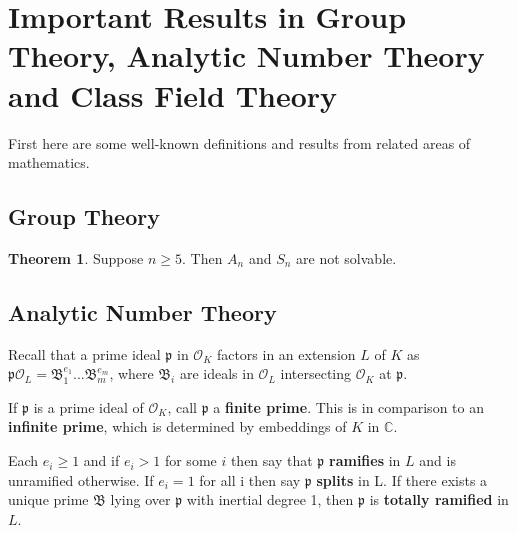 \documentclass[12pt]{extarticle}
\newcommand{\<}{\langle}
\renewcommand{\>}{\rangle}
\theoremstyle{definition}
\newtheorem{theorem}{Theorem}
\begin{document}
\section{Important Results in Group Theory, Analytic Number Theory and Class Field Theory}

First here are some well-known definitions and results from related areas of mathematics.   

\subsection{Group Theory}
\begin{theorem}
Suppose $n \geq 5$. Then $A_n$ and $S_n$ are not solvable. 
\end{theorem}
\subsection{Analytic Number Theory}
Recall that a prime ideal $\mathfrak{p}$ in $\mathcal{O}_K$ factors in an extension $L$ of $K$ as
$\mathfrak{p}\mathcal{O}_L=\mathfrak{B}_1^{e_1}...\mathfrak{B}_m^{e_m}$, where $\mathfrak{B}_i$ are ideals in $\mathcal{O}_L$ intersecting $\mathcal{O}_K$ at $\mathfrak{p}$. \par
If $\mathfrak{p}$ is a prime ideal of $\mathcal{O}_K$, call $\mathfrak{p}$ a \textbf{finite prime}. This is in comparison to an \textbf{infinite prime}, which is determined by embeddings of $K$ in $\mathbb{C}$. \par 
Each $e_i\geq1$ and if $e_i>1$ for some $i$ then say that $\mathfrak{p}$ \textbf{ramifies} in $L$ and is unramified otherwise. If $e_i=1$ for all i then say $\mathfrak{p}$ \textbf{splits} in L. If there exists a unique prime $\mathfrak{B}$ lying over $\mathfrak{p}$ with inertial degree 1, then $\mathfrak{p}$ is \textbf{totally ramified} in $L$. \par
\end{document}
